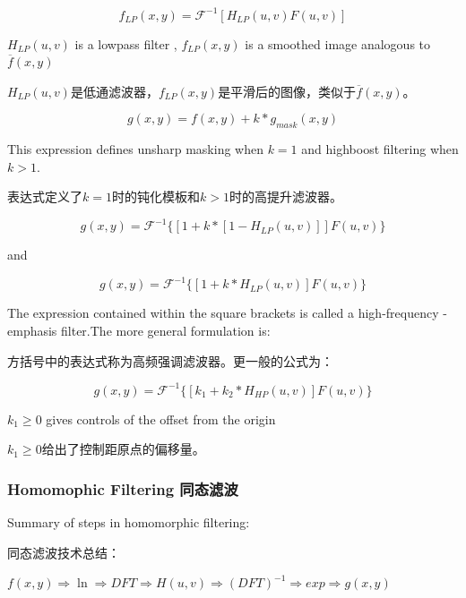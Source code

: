 \documentclass[12pt]{article}
\numberwithin{equation}{section}%
\begin{document}
\begin{equation} \label{4.56}
f_{LP}(x,y)=\mathscr{F}^{-1}[H_{LP}(u,v)F(u,v)]
\end{equation} 

$H_{LP}(u,v)$ is a lowpass filter , $f_{LP}(x,y)$ is a smoothed image analogous to $\overline{f}(x,y)$ 

$H_{LP}(u,v)$是低通滤波器，$f_{LP}(x,y)$是平滑后的图像，类似于$\overline{f}(x,y)$。

\begin{equation} \label{4.57}
g(x,y)=f(x,y)+k*g_{mask}(x,y)
\end{equation} 

This expression defines unsharp masking when $k=1$ and highboost filtering when $k>1$.

表达式定义了$k=1$时的钝化模板和$k>1$时的高提升滤波器。

\begin{equation} \label{4.58}
g(x,y)=\mathscr{F}^{-1}\{[1+k*[1-H_{LP}(u,v)]]F(u,v)\}
\end{equation} 

and 

\begin{equation} \label{4.59}
g(x,y)=\mathscr{F}^{-1}\{[1+k*H_{LP}(u,v)]F(u,v)\}
\end{equation} 

The expression contained within the square brackets is called a high-frequency -emphasis filter.The more general formulation is:

方括号中的表达式称为高频强调滤波器。更一般的公式为：

\begin{equation} \label{4.60}
g(x,y)=\mathscr{F}^{-1}\{[k_{1}+k_{2}*H_{HP}(u,v)]F(u,v)\}
\end{equation}

$k_{1}\geq 0$ gives controls of the offset from the origin

$k_{1}\geq 0$给出了控制距原点的偏移量。

\subsubsection{Homomophic Filtering 同态滤波}

Summary of steps in homomorphic filtering:

同态滤波技术总结：

$f(x,y)\Rightarrow \ln\Rightarrow DFT\Rightarrow H(u,v)\Rightarrow (DFT)^{-1}\Rightarrow exp\Rightarrow g(x,y)$
\end{document}
